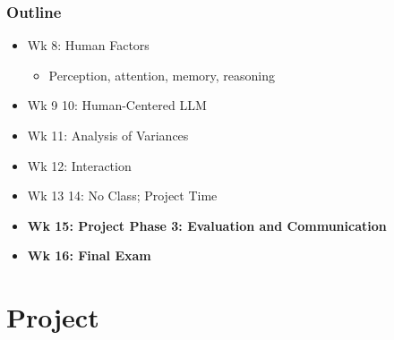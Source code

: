 \documentclass{beamer}
\begin{document}
\begin{frame}
	\frametitle{Outline}
	\begin{itemize}
		\item Wk 8: Human Factors
		\begin{itemize}
			\item Perception, attention, memory, reasoning
		\end{itemize}
        \item Wk 9 10: Human-Centered LLM
        \item Wk 11: Analysis of Variances
        \item Wk 12: Interaction
		\item Wk 13 14: No Class; Project Time
		\item \textbf{Wk 15: Project Phase 3: Evaluation and Communication}
		\item \textbf{Wk 16: Final Exam}
	\end{itemize}
\end{frame}

\section{Project} %
\end{document}
